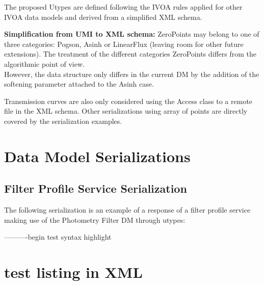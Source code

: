 \documentclass[11pt,a4paper]{ivoa}
\begin{document}
\begin{appendices}
The proposed Utypes are defined following the IVOA rules applied for other IVOA data models and derived from a simplified XML schema.
\par

\textbf{Simplification from UMI to XML schema:}
ZeroPoints may belong to one of three categories: Pogson, Asinh or LinearFlux (leaving room for other future extensions). The treatment of the different categories ZeroPoints differs from the algorithmic point of view. \\
However, the data structure only differs in the current DM by the addition of the softening parameter attached to the Asinh case.
\par

Transmission curves are also only considered using the Access class to a remote file in the XML schema. Other serializations using array of points are directly covered by the serialization examples.
\par

\section{Data Model Serializations} \label{serialization}
\subsection{Filter Profile Service Serialization} \label{serializationfilter}

The following serialization is an example of a response of a filter profile service making use of the Photometry Filter DM through utypes:
\par





----------begin test syntax highlight 
\section{test listing in XML}
    




\end{appendices}
\end{document}
